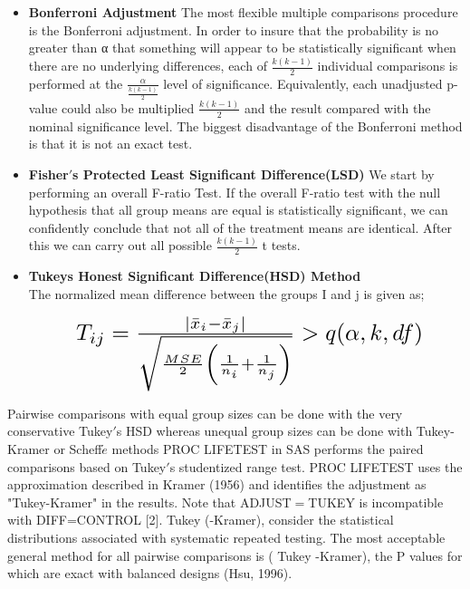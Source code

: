 \documentclass[11pt]{article}
\numberwithin{figure}{section}
\begin{document}
\begin{itemize}
\item \textbf{	Bonferroni Adjustment}
The most flexible multiple comparisons procedure is the Bonferroni adjustment. In order to insure that the probability is no greater than α that something will appear to be statistically significant when there are no underlying differences, each of   $\frac{k(k-1)}{2}$  individual comparisons is performed at the   $\frac{\alpha}{\frac{k(k-1)}{2}} $   level of significance. Equivalently, each unadjusted p-value could also be multiplied   $\frac{k(k-1)}{2}$ and the result compared with the nominal significance level.
The biggest disadvantage of the Bonferroni method is that  it is not an exact test.

\item 	\textbf{Fisher$'$s Protected Least Significant Difference(LSD)}
We start by performing an overall F-ratio Test. If the overall F-ratio test with the null hypothesis that all group means are equal is statistically significant, we can confidently conclude that not all of the treatment means are identical. After this we can carry out all possible  $\frac{k(k-1)}{2}$   t tests.
\item\textbf{\color{black} Tukeys  Honest Significant Difference(HSD) Method}\\
The normalized mean difference between the groups I and j is given as;

 \begin{equation*}
\scalebox{1.8}{
$T _{ij}=\frac{|\bar{x}_{i}-\bar{x}_{j}|}{\sqrt{\frac{MSE}{2}\left(\frac{1}{n_{i}}+\frac{1}{n_{j}}\right)}}>q(\alpha,k,df)$}
\end{equation*}

\end{itemize}

Pairwise comparisons with equal group sizes can be done with the very conservative Tukey$'$s HSD whereas unequal group sizes can be done with Tukey-Kramer or Scheff$\acute{e}$ methods
PROC LIFETEST in SAS performs the paired comparisons based on Tukey$'$s studentized range test. PROC LIFETEST uses the approximation described in Kramer (1956) and identifies the adjustment as "Tukey-Kramer" in the results. Note that ADJUST$=$TUKEY is incompatible with DIFF=CONTROL [2]. Tukey (-Kramer), consider the statistical distributions associated with systematic repeated testing. The most acceptable general method for all pairwise comparisons is ( Tukey -Kramer), the P values for which are exact with balanced designs (Hsu, 1996).
\end{document}
